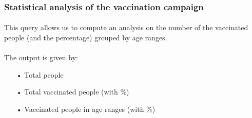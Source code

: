\documentclass[a4paper,12pt]{article}
\begin{document}
\subsubsection{Statistical analysis of the vaccination campaign}
\paragraph{} This query allows us to compute an analysis on the number of the vaccinated people (and the percentage) grouped by age ranges.
\begin{center}
\end{center}
\paragraph{} The output is given by: 
\begin{itemize}
\item[•] Total people
\item[•] Total vaccinated people (with \%)
\item[•] Vaccinated people in age ranges (with \%)
\begin{center}
\end{center}
\end{itemize}
\end{document}
